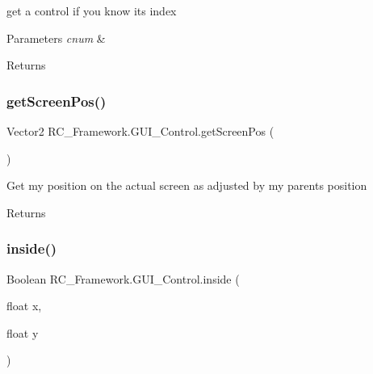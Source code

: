 get a control if you know its index 


\begin{DoxyParams}{Parameters}
{\em cnum} & \\
\hline
\end{DoxyParams}
\begin{DoxyReturn}{Returns}

\end{DoxyReturn}
\mbox{\label{class_r_c___framework_1_1_g_u_i___control_aec3a07f10f946dff6dd7563eff7a786d}} 
\subsubsection{\texorpdfstring{get\+Screen\+Pos()}{getScreenPos()}}
{\footnotesize\ttfamily Vector2 R\+C\+\_\+\+Framework.\+G\+U\+I\+\_\+\+Control.\+get\+Screen\+Pos (\begin{DoxyParamCaption}{ }\end{DoxyParamCaption})}



Get my position on the actual screen as adjusted by my parents position 

\begin{DoxyReturn}{Returns}

\end{DoxyReturn}
\mbox{\label{class_r_c___framework_1_1_g_u_i___control_a810c7c0dfb643da1861b8e2627642aa1}} 
\subsubsection{\texorpdfstring{inside()}{inside()}}
{\footnotesize\ttfamily Boolean R\+C\+\_\+\+Framework.\+G\+U\+I\+\_\+\+Control.\+inside (\begin{DoxyParamCaption}\item[{float}]{x,  }\item[{float}]{y }\end{DoxyParamCaption})}



